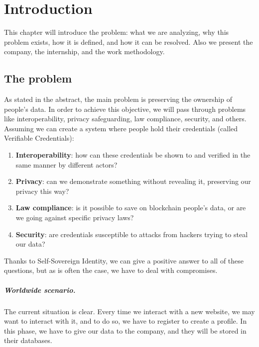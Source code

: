 
\chapter{Introduction}
This chapter will introduce the problem: what we are analyzing, why 
this problem exists, how it is defined, and how it can be resolved. 
Also we present the company, the internship, and the work 
methodology.
\section{The problem}
As stated in the abstract, the main problem is preserving the ownership 
of people's data. In order to achieve this objective, we will pass through 
problems like interoperability, privacy safeguarding, law compliance, security,
and others.
\vspace*{0.3cm}\\
Assuming we can create a system where people hold their credentials 
(called Verifiable Credentials):
\begin{enumerate}
    \setlength\itemsep{-0.3em}
    \item \textbf{Interoperability}: how can these credentials be shown to and 
    verified in the same manner by different actors?
    \item \textbf{Privacy}: can we demonstrate something without revealing it, 
    preserving our privacy this way?
    \item \textbf{Law compliance}: is it possible to save on blockchain people's
    data, or are we going against specific privacy laws?
    \item \textbf{Security}: are credentials susceptible to attacks from hackers 
    trying to steal our data?
\end{enumerate}
Thanks to Self-Sovereign Identity, we can give a positive answer to all
of these questions, but as is often the case, we have to deal with 
compromises.

\paragraph{Worldwide scenario.} The current situation is clear. Every time we 
interact with a new website, we may want to interact with it, and to do so, we 
have to register to create a profile. In this phase, we have to give our data to 
the company, and they will be stored in their databases.

